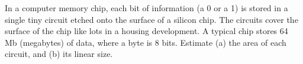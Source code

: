 In a computer memory chip, each bit of information (a 0
or a 1) is stored in a single tiny circuit etched onto the
surface of a silicon chip. The circuits cover the surface of
the chip like lots in a housing development. A typical chip
stores 64 Mb (megabytes) of data, where a byte is 8 bits.
Estimate (a) the area of each circuit, and (b) its linear size.

